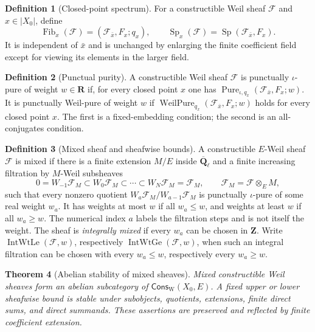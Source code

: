 \documentclass[10pt]{article}
\newtheorem{theorem}{Theorem}[section]
\theoremstyle{definition}
\newtheorem{definition}[theorem]{Definition}
\newcommand{\Qlb}{\overline{\mathbf Q}_\ell}
\begin{document}
\begin{definition}[Closed-point spectrum]
For a constructible Weil sheaf \(\mathcal F\) and \(x\in|X_0|\), define
\[
 \operatorname{Fib}_x(\mathcal F)
   =(\mathcal F_{\bar x},F_x;q_x),
 \qquad
        \operatorname{Sp}_x(\mathcal F)
        =\operatorname{Sp}(\mathcal F_{\bar x},F_x).
\]
It is independent of \(\bar x\) and is unchanged by enlarging the finite
coefficient field except for viewing its elements in the larger field.
\end{definition}

\begin{definition}[Punctual purity]
A constructible Weil sheaf \(\mathcal F\) is punctually
\(\iota\)-pure of weight \(w\in\mathbf R\) if, for every closed point \(x\)
one has
\(\operatorname{Pure}_{\iota,q_x}(\mathcal F_{\bar x},F_x;w)\).
It is punctually Weil-pure of weight \(w\) if
\(\operatorname{WeilPure}_{q_x}(\mathcal F_{\bar x},F_x;w)\) holds for
every closed point \(x\).  The first is a fixed-embedding condition; the
second is an all-conjugates condition.
\end{definition}

\begin{definition}[Mixed sheaf and sheafwise bounds]
A constructible \(E\)-Weil sheaf \(\mathcal F\) is mixed if there is a finite
extension \(M/E\) inside \(\Qlb\) and a finite increasing filtration by
\(M\)-Weil subsheaves
\[
 0=W_{-1}\mathcal F_M\subset W_0\mathcal F_M\subset\cdots
   \subset W_N\mathcal F_M=\mathcal F_M,
 \qquad \mathcal F_M=\mathcal F\otimes_E M,
\]
such that every nonzero quotient
\(W_a\mathcal F_M/W_{a-1}\mathcal F_M\) is punctually
\(\iota\)-pure of some real weight \(w_a\).  It has weights at most \(w\)
if all \(w_a\le w\), and weights at least \(w\) if all \(w_a\ge w\).
The numerical index \(a\) labels the filtration steps and is not itself the
weight.
The sheaf is \emph{integrally mixed} if every \(w_a\) can be chosen in
\(\mathbf Z\).  Write \(\operatorname{IntWtLe}(\mathcal F,w)\),
respectively \(\operatorname{IntWtGe}(\mathcal F,w)\), when such an
integral filtration can be chosen with every \(w_a\le w\), respectively
every \(w_a\ge w\).
\end{definition}

\begin{theorem}[Abelian stability of mixed sheaves]
Mixed constructible Weil sheaves form an abelian subcategory of
\(\mathsf{Cons}_{\mathrm W}(X_0,E)\).  A fixed upper or lower sheafwise
bound is stable under subobjects, quotients, extensions, finite direct sums,
and direct summands.  These assertions are preserved and reflected by
finite coefficient extension.

\end{theorem}
\end{document}
